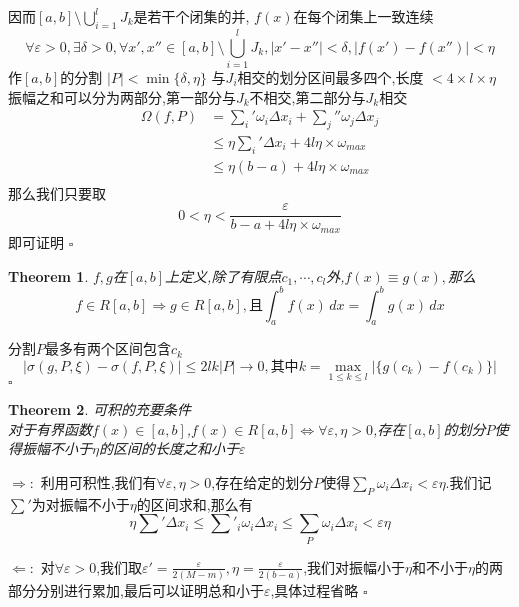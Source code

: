 \documentclass[11pt,hyperref,a4paper,UTF8]{ctexart}
\newtheorem{theorem}{Theorem}[subsection]
\newenvironment{cproof}{%
\heiti{证明}\kaishu
}{%
  \hfill $\square$
  \par\bigskip
}
\newcommand{\abs}[1]{\left|#1\right|}
\begin{document}
\begin{CJK}{UTF8}{gkai}
\begin{cproof}
  因而$[a,b]\setminus \bigcup_{i = 1}^l J_k$是若干个闭集的并,
  $f(x)$在每个闭集上一致连续
  \[\forall \varepsilon > 0,\exists \delta > 0 ,\forall x',x'' \in [a,b]\setminus \bigcup_{i = 1}^l J_k,|x' - x'' | < \delta , \abs{f(x') - f(x'')}  < \eta\]
  作$[a,b]$的分割 $|P| < \min\{\delta,\eta\}$
  与$J_i$相交的划分区间最多四个,长度 $< 4 \times l \times \eta$
  振幅之和可以分为两部分,第一部分与$J_k$不相交,第二部分与$J_k$相交
  \[
  \begin{aligned}
  \Omega(f,P) &= \sum_{i}' \omega_i \Delta x_i + \sum_{j}'' \omega_j \Delta x_j\\
  &\leq \eta \sum_{i}'\Delta x_i + 4l\eta \times  \omega_{max}\\
  &\leq \eta(b - a) + 4 l\eta  \times \omega_{max}\\
  \end{aligned}
  \]
  那么我们只要取 \[0 < \eta < \dfrac{\varepsilon}{b - a + 4 l\eta\times\omega_{max}}\]
  即可证明
\end{cproof}

\begin{theorem}
  $f,g$在$[a,b]$上定义,除了有限点$c_1,\cdots ,c_l$外,$f(x) \equiv g(x),$那么\[f\in R[a,b] \Rightarrow g \in R[a,b] ,\text{且}\int_{a}^{b}f(x)\, dx = \int_{a}^{b}g(x)\, dx \]
\end{theorem}

\begin{cproof}
  分割$P$最多有两个区间包含$c_k$
  \[\abs{\sigma(g,P,\xi) - \sigma(f,P,\xi)} \leq 2lk |P| \rightarrow 0,\text{其中}k = \max_{1\leq k\leq l}|\{g(c_k) - f(c_k)\}|\]
\end{cproof}

\begin{theorem}
  可积的充要条件\\

  对于有界函数$f(x) \in [a,b]$,$f(x) \in R[a,b] \Leftrightarrow \forall \varepsilon,\eta > 0$,存在$[a,b]$的划分$P$使得振幅不小于$\eta$的区间的长度之和小于$\varepsilon$
\end{theorem}

\begin{cproof}
  $\Rightarrow:$ 利用可积性,我们有$\forall \varepsilon,\eta>0$,存在给定的划分$P$使得$\sum_{P} \omega_i \Delta x_i < \varepsilon \eta$.我们记$\sum'$为对振幅不小于$\eta$的区间求和,那么有
  \[\eta \sum' \Delta x_i \leq \sum'_i \omega_i\Delta x_i \leq \sum_P \omega_i\Delta x_i < \varepsilon \eta\]

  $\Leftarrow:$ 对$\forall \varepsilon > 0$,我们取$\varepsilon' = \frac{\varepsilon}{2(M - m)}, \eta = \frac{\varepsilon}{2(b - a)}$,我们对振幅小于$\eta$和不小于$\eta$的两部分分别进行累加,最后可以证明总和小于$\varepsilon$,具体过程省略
\end{cproof}


\end{CJK}
\end{document}
